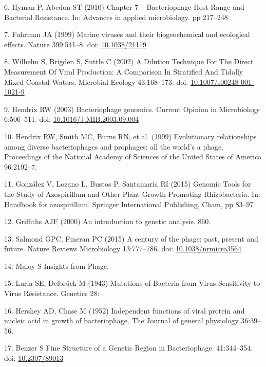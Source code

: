 \documentclass[12pt,twoside]{mitthesis-manusdown}
\begin{document}
\hypertarget{ref-Hyman2010}{}
6. Hyman P, Abedon ST (2010) Chapter 7 -- Bacteriophage Host Range and
Bacterial Resistance. In: Advances in applied microbiology. pp 217--248

\hypertarget{ref-Fuhrman1999}{}
7. Fuhrman JA (1999) Marine viruses and their biogeochemical and
ecological effects. Nature 399:541--8. doi:
\href{https://doi.org/10.1038/21119}{10.1038/21119}

\hypertarget{ref-Wilhelm2002}{}
8. Wilhelm S, Brigden S, Suttle C (2002) A Dilution Technique For The
Direct Measurement Of Viral Production: A Comparison In Stratified And
Tidally Mixed Coastal Waters. Microbial Ecology 43:168--173. doi:
\href{https://doi.org/10.1007/s00248-001-1021-9}{10.1007/s00248-001-1021-9}

\hypertarget{ref-Hendrix2003}{}
9. Hendrix RW (2003) Bacteriophage genomics. Current Opinion in
Microbiology 6:506--511. doi:
\href{https://doi.org/10.1016/J.MIB.2003.09.004}{10.1016/J.MIB.2003.09.004}

\hypertarget{ref-Hendrix1999}{}
10. Hendrix RW, Smith MC, Burns RN, et al. (1999) Evolutionary
relationships among diverse bacteriophages and prophages: all the
world's a phage. Proceedings of the National Academy of Sciences of the
United States of America 96:2192--7.

\hypertarget{ref-Gonzalez2015}{}
11. González V, Lozano L, Bustos P, Santamaría RI (2015) Genomic Tools
for the Study of Azospirillum and Other Plant Growth-Promoting
Rhizobacteria. In: Handbook for azospirillum. Springer International
Publishing, Cham, pp 83--97

\hypertarget{ref-Griffiths2000}{}
12. Griffiths AJF (2000) An introduction to genetic analysis. 860.

\hypertarget{ref-Salmond2015}{}
13. Salmond GPC, Fineran PC (2015) A century of the phage: past, present
and future. Nature Reviews Microbiology 13:777--786. doi:
\href{https://doi.org/10.1038/nrmicro3564}{10.1038/nrmicro3564}

\hypertarget{ref-Maloy}{}
14. Maloy S Insights from Phage.

\hypertarget{ref-Luria1943}{}
15. Luria SE, Delbrück M (1943) Mutations of Bacteria from Virus
Sensitivity to Virus Resistance. Genetics 28:

\hypertarget{ref-HERSHEY1952}{}
16. Hershey AD, Chase M (1952) Independent functions of viral protein
and nucleic acid in growth of bacteriophage. The Journal of general
physiology 36:39--56.

\hypertarget{ref-Benzer}{}
17. Benzer S Fine Structure of a Genetic Region in Bacteriophage.
41:344--354. doi: \href{https://doi.org/10.2307/89013}{10.2307/89013}
\end{document}
